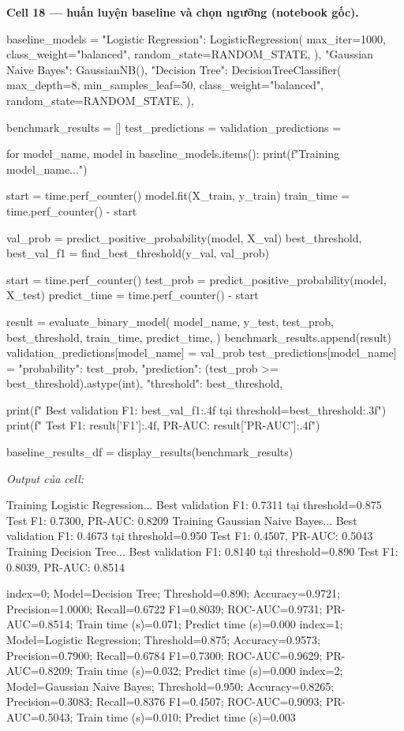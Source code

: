 \documentclass[12pt,a4paper]{report}
\begin{document}
\par\medskip\noindent\textbf{Cell 18 --- huấn luyện baseline và chọn ngưỡng (notebook gốc).}
\begin{NotebookCode}
baseline_models = {
    "Logistic Regression": LogisticRegression(
        max_iter=1000,
        class_weight="balanced",
        random_state=RANDOM_STATE,
    ),
    "Gaussian Naive Bayes": GaussianNB(),
    "Decision Tree": DecisionTreeClassifier(
        max_depth=8,
        min_samples_leaf=50,
        class_weight="balanced",
        random_state=RANDOM_STATE,
    ),
}

benchmark_results = []
test_predictions = {}
validation_predictions = {}

for model_name, model in baseline_models.items():
    print(f"Training {model_name}...")

    start = time.perf_counter()
    model.fit(X_train, y_train)
    train_time = time.perf_counter() - start

    val_prob = predict_positive_probability(model, X_val)
    best_threshold, best_val_f1 = find_best_threshold(y_val, val_prob)

    start = time.perf_counter()
    test_prob = predict_positive_probability(model, X_test)
    predict_time = time.perf_counter() - start

    result = evaluate_binary_model(
        model_name,
        y_test,
        test_prob,
        best_threshold,
        train_time,
        predict_time,
    )
    benchmark_results.append(result)
    validation_predictions[model_name] = val_prob
    test_predictions[model_name] = {
        "probability": test_prob,
        "prediction": (test_prob >= best_threshold).astype(int),
        "threshold": best_threshold,
    }

    print(f"  Best validation F1: {best_val_f1:.4f} tại threshold={best_threshold:.3f}")
    print(f"  Test F1: {result['F1']:.4f}, PR-AUC: {result['PR-AUC']:.4f}")

baseline_results_df = display_results(benchmark_results)
\end{NotebookCode}
\noindent\textit{Output của cell:}
\begin{NotebookOutput}
Training Logistic Regression...
  Best validation F1: 0.7311 tại threshold=0.875
  Test F1: 0.7300, PR-AUC: 0.8209
Training Gaussian Naive Bayes...
  Best validation F1: 0.4673 tại threshold=0.950
  Test F1: 0.4507, PR-AUC: 0.5043
Training Decision Tree...
  Best validation F1: 0.8140 tại threshold=0.890
  Test F1: 0.8039, PR-AUC: 0.8514

index=0; Model=Decision Tree; Threshold=0.890; Accuracy=0.9721; Precision=1.0000; Recall=0.6722
  F1=0.8039; ROC-AUC=0.9731; PR-AUC=0.8514; Train time (s)=0.071; Predict time (s)=0.000
index=1; Model=Logistic Regression; Threshold=0.875; Accuracy=0.9573; Precision=0.7900; Recall=0.6784
  F1=0.7300; ROC-AUC=0.9629; PR-AUC=0.8209; Train time (s)=0.032; Predict time (s)=0.000
index=2; Model=Gaussian Naive Bayes; Threshold=0.950; Accuracy=0.8265; Precision=0.3083; Recall=0.8376
  F1=0.4507; ROC-AUC=0.9093; PR-AUC=0.5043; Train time (s)=0.010; Predict time (s)=0.003
\end{NotebookOutput}
\end{document}
